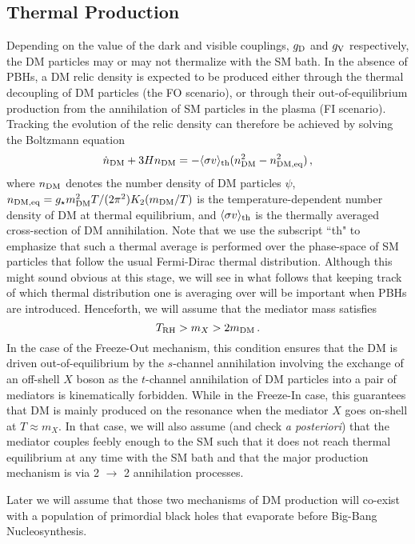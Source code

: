 \documentclass[aps,prd,reprint,twocolumn,preprintnumbers,floatfix,nofootinbib]{revtex4-1}
\newcommand{\be}{\begin{equation}}
\newcommand{\ee}{\end{equation}}
\newcommand{\gV}{g_{\rm V}}
\newcommand{\gD}{g_{\rm D}}
\newcommand{\mDM}{m_{\rm DM}}
\newcommand{\nDM}{n_{\rm DM}}
\newcommand{\nDMeq}{n_{\rm DM,eq}}
\newcommand{\TRH}{T_{\rm RH}}
\begin{document}
\subsection{Thermal Production}
Depending on the value of the dark and visible couplings, $\gD$ and $\gV$ respectively, the DM particles may or may not thermalize with the SM bath. In the absence of PBHs, a DM relic density is expected to be produced either through the thermal decoupling of DM particles (the FO scenario), or through their out-of-equilibrium production from the annihilation of SM particles in the plasma (FI scenario). Tracking the evolution of the relic density can therefore be achieved by solving the Boltzmann equation
\be
\dot{n}_{\rm DM} + 3H n_{\rm DM} = -\langle\sigma v \rangle_{\rm th} ( \nDM^2 - \nDMeq^2)\,,
\ee
where $\nDM$ denotes the number density of DM particles $\psi$, $\nDMeq=g_\star \mDM^2 T/(2\pi^2)K_2(\mDM/T)$ is the temperature-dependent number density of DM at thermal equilibrium, and $\langle \sigma v\rangle_{\rm th}$ is the thermally averaged cross-section of DM annihilation. Note that we use the subscript ``th" to emphasize that such a thermal average is performed over the phase-space of SM particles that follow the usual Fermi-Dirac thermal distribution. Although this might sound obvious at this stage, we will see in what follows that keeping track of which thermal distribution one is averaging over will be important when PBHs are introduced. 
Henceforth, we will assume that the mediator mass satisfies  
\be\label{eq:AssumptionMasses}
\TRH > m_X > 2\mDM\,.
\ee
In the case of the Freeze-Out mechanism, this condition ensures that the DM is driven out-of-equilibrium by the $s$-channel annihilation involving the exchange of an off-shell $X$ boson as the $t$-channel annihilation of DM particles into a pair of mediators is kinematically forbidden. While in the Freeze-In case, this guarantees that DM is mainly produced on the resonance when the mediator $X$ goes on-shell at $T\approx m_X$. In that case, we will also assume (and check {\em a posteriori}) that the mediator couples feebly enough to the SM such that it does not reach thermal equilibrium at any time with the SM bath and that the major production mechanism is via 2 $\to$ 2 annihilation processes.

Later we will assume that those two mechanisms of DM production will co-exist with a population of primordial black holes that evaporate before Big-Bang Nucleosynthesis.
\end{document}
